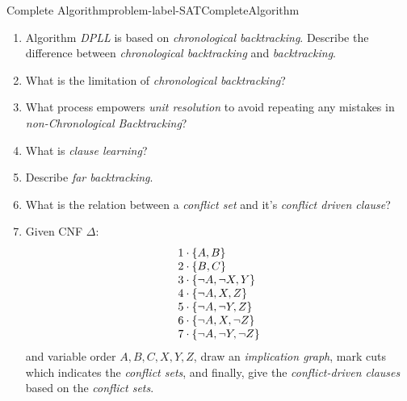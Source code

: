 \documentclass[main.tex]{subfiles}
\begin{document}
\begin{problem}{Complete Algorithm}{problem-label-SATCompleteAlgorithm}
\begin{enumerate}[(1)]
    \[
        \Delta=\{\;\{\neg A,\neg B\},\;\{B,C\},\;\{\neg C,D\},\;\{A\}\;\},
    \]
    and CNF:
    \[
        \Delta=\{\;\{\neg A,\neg B\},\;\{B,C\},\;\{\neg C,D\},\;\{C\}\;\}.
    \]
    \item Algorithm \textit{DPLL} is based on \textit{chronological backtracking}. Describe the difference between \textit{chronological backtracking} and \textit{backtracking}.
    \item What is the limitation of \textit{chronological backtracking}?
    \item What process empowers \textit{unit resolution} to avoid repeating any mistakes in \textit{non-Chronological Backtracking}?
    \item What is \textit{clause learning}?
    \item Describe \textit{far backtracking}.
    \item What is the relation between a \textit{conflict set} and it's \textit{conflict driven clause}?
    \item Given CNF $\Delta$:
    \[
        \begin{array}{l l}{1\cdot\{A,B\}}\\ {2\cdot\{B,C\}}\\ {3\cdot\{\lnot A, \lnot X, Y\}}\\{4\cdot\{\lnot A, X, Z\}}\\ {5\cdot\{\lnot A,\lnot Y,Z\}}\\ {6\cdot\{\lnot A, X, \lnot Z\}}\\ {7\cdot\{\lnot A,\lnot Y,\lnot Z\}}\end{array}
    \]
    and variable order $A, B, C, X, Y, Z$, draw an \textit{implication graph}, mark cuts which indicates the \textit{conflict sets}, and finally, give the \textit{conflict-driven clauses} based on the \textit{conflict sets}.
    
\end{enumerate}
\end{problem}
\vspace*{4\baselineskip}

\vspace*{4\baselineskip}
\end{document}
